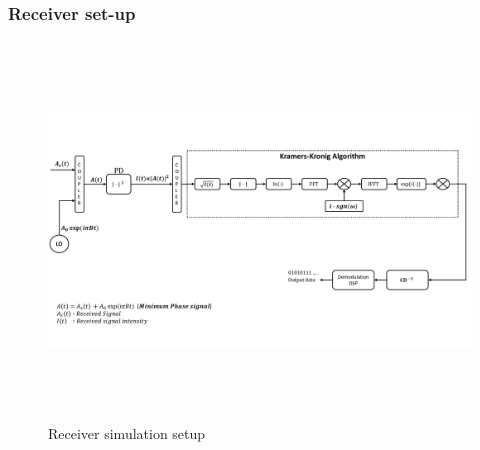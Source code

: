 \subsubsection{Receiver set-up}

\begin{figure}[h]
	\centering
	\includegraphics[width=1.0\textwidth, height=10cm]{./sdf/simplified_coherent_receiver/figures/Simulation_setup_Rx.pdf}
	\caption{Receiver simulation setup}\label{Simulation_setup_Rx}
\end{figure}



